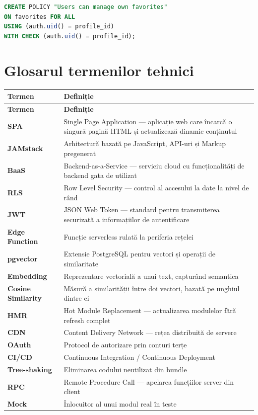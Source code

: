 \documentclass[12pt,a4paper,oneside]{report}
\begin{document}
\begin{lstlisting}[language=SQL, caption={Politici RLS pentru tabela favorites}]
CREATE POLICY "Users can manage own favorites"
ON favorites FOR ALL
USING (auth.uid() = profile_id)
WITH CHECK (auth.uid() = profile_id);
\end{lstlisting}


\chapter{Glosarul termenilor tehnici}

\begin{longtable}{p{4cm} p{10cm}}
\toprule
\textbf{Termen} & \textbf{Definiție} \\
\midrule
\endfirsthead
\toprule
\textbf{Termen} & \textbf{Definiție} \\
\midrule
\endhead
\textbf{SPA} & Single Page Application — aplicație web care încarcă o singură pagină HTML și actualizează dinamic conținutul \\
\textbf{JAMstack} & Arhitectură bazată pe JavaScript, API-uri și Markup pregenerat \\
\textbf{BaaS} & Backend-as-a-Service — serviciu cloud cu funcționalități de backend gata de utilizat \\
\textbf{RLS} & Row Level Security — control al accesului la date la nivel de rând \\
\textbf{JWT} & JSON Web Token — standard pentru transmiterea securizată a informațiilor de autentificare \\
\textbf{Edge Function} & Funcție serverless rulată la periferia rețelei \\
\textbf{pgvector} & Extensie PostgreSQL pentru vectori și operații de similaritate \\
\textbf{Embedding} & Reprezentare vectorială a unui text, capturând semantica \\
\textbf{Cosine Similarity} & Măsură a similarității între doi vectori, bazată pe unghiul dintre ei \\
\textbf{HMR} & Hot Module Replacement — actualizarea modulelor fără refresh complet \\
\textbf{CDN} & Content Delivery Network — rețea distribuită de servere \\
\textbf{OAuth} & Protocol de autorizare prin conturi terțe \\
\textbf{CI/CD} & Continuous Integration / Continuous Deployment \\
\textbf{Tree-shaking} & Eliminarea codului neutilizat din bundle \\
\textbf{RPC} & Remote Procedure Call — apelarea funcțiilor server din client \\
\textbf{Mock} & Înlocuitor al unui modul real în teste \\
\bottomrule
\end{longtable}
\end{document}
